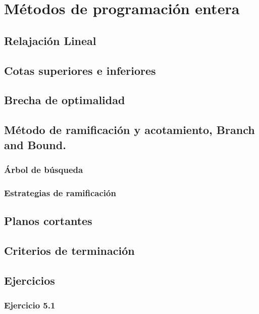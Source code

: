 \section{Métodos de programación entera}

\subsection{Relajación Lineal}

\subsection{Cotas superiores e inferiores}

\subsection{Brecha de optimalidad}

\subsection{Método de ramificación y acotamiento, Branch and Bound.}

\subsubsection{Árbol de búsqueda}

\subsubsection{Estrategias de ramificación}

\subsection{Planos cortantes}

\subsection{Criterios de terminación}

\subsection{Ejercicios}

\subsubsection{Ejercicio 5.1}


